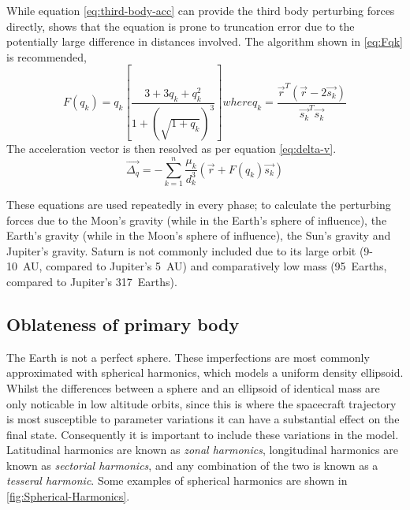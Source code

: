 While equation \eqref{eq:third-body-acc} can provide the third body perturbing forces directly, \textcite{Battin1999} shows that the equation is prone to truncation error due to the potentially large difference in distances involved. The algorithm shown in \eqref{eq:Fqk} is recommended,
\begin{subequations}
\begin{equation} \label{eq:Fqk}
F(q_k) = q_k\left[ \frac{3+3q_{k}+q_{k}^{2}}{1+(\sqrt{1+q_{k}})^{3}} \right] 
\end{equation} 
where
\begin{equation}
q_k = \frac{\vec{r}^{T}(\vec{r}-2\vec{s_{k}})}{\vec{s_k}^{T}\vec{s_k}}
\end{equation}
\end{subequations}
The acceleration vector is then resolved as per equation \eqref{eq:delta-v}.
\begin{equation}\label{eq:delta-v}
\vec{\Delta_q} = -\sum_{k=1}^{n}\frac{\mu_{k}}{d_{k}^{3}}(\vec{r}+F(q_{k})\vec{s_{k}})
\end{equation}

These equations are used repeatedly in every phase; to calculate the perturbing forces due to the Moon's gravity (while in the Earth's sphere of influence), the Earth's gravity (while in the Moon's sphere of influence), the Sun's gravity and Jupiter's gravity. Saturn is not commonly included due to its large orbit (9-10~AU, compared to Jupiter's 5~AU) and comparatively low mass (95~Earths, compared to Jupiter's 317~Earths).



\subsection{Oblateness of primary body} \label{sub:Oblateness}

The Earth is not a perfect sphere. These imperfections are most commonly approximated with spherical harmonics, which models a uniform density ellipsoid. Whilst the differences between a sphere and an ellipsoid of identical mass are only noticable in low altitude orbits, since this is where the spacecraft trajectory is most susceptible to parameter variations it can have a substantial effect on the final state. Consequently it is important to include these variations in the model. Latitudinal harmonics are known as \emph{zonal harmonics}, longitudinal harmonics are known as \emph{sectorial harmonics}, and any combination of the two is known as a \emph{tesseral harmonic}. Some examples of spherical harmonics are shown in \autoref{fig:Spherical-Harmonics}.

